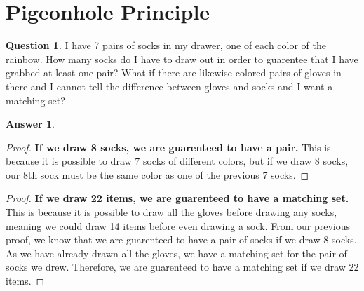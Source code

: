 \documentclass[article, 12pt]{article}
\theoremstyle{definition}
\newtheorem{question}{Question}
\newtheorem{answer}{Answer}
\begin{document}
    \section{Pigeonhole Principle}
    \begin{question}
        I have 7 pairs of socks in my drawer, one of each color of the rainbow. How many socks do I have to draw out in order to guarentee that I have grabbed at least one pair? What if there are likewise colored pairs of gloves in there and I cannot tell the difference between gloves and socks and I want a matching set?
    \end{question}
    \begin{answer}
        \begin{proof} 
            \textbf{If we draw 8 socks, we are guarenteed to have a pair.} This is because it is possible to draw 7 socks of different colors, but if we draw 8 socks, our 8th sock must be the same color as one of the previous 7 socks.
        \end{proof}
        \begin{proof}
            \textbf{If we draw 22 items, we are guarenteed to have a matching set.} This is because it is possible to draw all the gloves before drawing any socks, meaning we could draw 14 items before even drawing a sock. From our previous proof, we know that we are guarenteed to have a pair of socks if we draw 8 socks. As we have already drawn all the gloves, we have a matching set for the pair of socks we drew. Therefore, we are guarenteed to have a matching set if we draw 22 items. 
        \end{proof}
    \end{answer}
\end{document}
